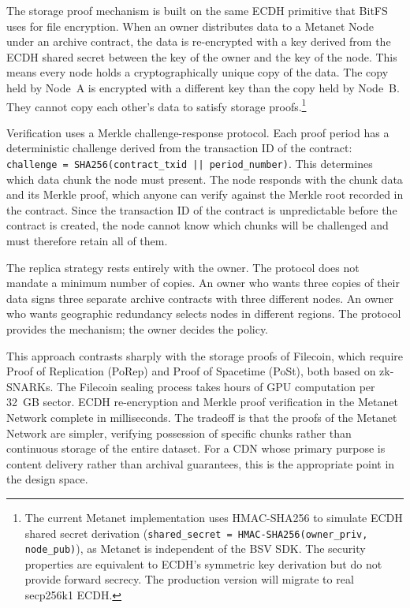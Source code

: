 \documentclass[11pt,a4paper]{article}
\begin{document}
The storage proof mechanism is built on the same ECDH primitive that BitFS uses for file encryption. When an owner distributes data to a Metanet Node under an archive contract, the data is re-encrypted with a key derived from the ECDH shared secret between the key of the owner and the key of the node. This means every node holds a cryptographically unique copy of the data. The copy held by Node~A is encrypted with a different key than the copy held by Node~B. They cannot copy each other's data to satisfy storage proofs.\footnote{The current Metanet implementation uses HMAC-SHA256 to simulate ECDH shared secret derivation (\texttt{shared\_secret = HMAC-SHA256(owner\_priv, node\_pub)}), as Metanet is independent of the BSV SDK. The security properties are equivalent to ECDH's symmetric key derivation but do not provide forward secrecy. The production version will migrate to real secp256k1 ECDH.}

Verification uses a Merkle challenge-response protocol. Each proof period has a deterministic challenge derived from the transaction ID of the contract: \texttt{challenge = SHA256(contract\_txid || period\_number)}. This determines which data chunk the node must present. The node responds with the chunk data and its Merkle proof, which anyone can verify against the Merkle root recorded in the contract. Since the transaction ID of the contract is unpredictable before the contract is created, the node cannot know which chunks will be challenged and must therefore retain all of them.

The replica strategy rests entirely with the owner. The protocol does not mandate a minimum number of copies. An owner who wants three copies of their data signs three separate archive contracts with three different nodes. An owner who wants geographic redundancy selects nodes in different regions. The protocol provides the mechanism; the owner decides the policy.

This approach contrasts sharply with the storage proofs of Filecoin, which require Proof of Replication (PoRep) and Proof of Spacetime (PoSt), both based on zk-SNARKs. The Filecoin sealing process takes hours of GPU computation per 32~GB sector. ECDH re-encryption and Merkle proof verification in the Metanet Network complete in milliseconds. The tradeoff is that the proofs of the Metanet Network are simpler, verifying possession of specific chunks rather than continuous storage of the entire dataset. For a CDN whose primary purpose is content delivery rather than archival guarantees, this is the appropriate point in the design space.
\end{document}
